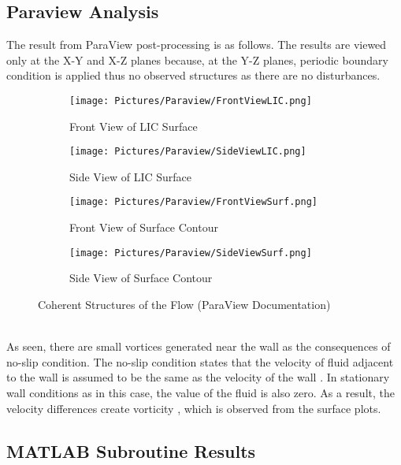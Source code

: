 \documentclass[11pt]{article}
\begin{document}
\subsection{Paraview Analysis}
The result from ParaView post-processing is as follows. The results are viewed only at the X-Y and X-Z planes because, at the Y-Z planes, periodic boundary condition is applied thus no observed structures as there are no disturbances. 
\begin{figure}[h!]
     \centering
     \begin{subfigure}[ht]{0.49\textwidth}
         \centering
         \texttt{[image: Pictures/Paraview/FrontViewLIC.png]}
         \caption{Front View of LIC Surface}
         \label{fig:FVLIC}
     \end{subfigure}
     \begin{subfigure}[ht]{0.49\textwidth}
         \centering
         \texttt{[image: Pictures/Paraview/SideViewLIC.png]}
         \caption{Side View of LIC Surface}
         \label{fig:SVLIC}
     \end{subfigure}
     \begin{subfigure}[ht]{0.49\textwidth}
         \centering
        \texttt{[image: Pictures/Paraview/FrontViewSurf.png]}
         \caption{Front View of Surface Contour}
         \label{fig:FVSC}
     \end{subfigure}
     \begin{subfigure}[ht]{0.49\textwidth}
         \centering
        \texttt{[image: Pictures/Paraview/SideViewSurf.png]}
         \caption{Side View of Surface Contour}
         \label{fig:SVSC}
     \end{subfigure}
        \caption{Coherent Structures of the Flow (ParaView Documentation)}
        \label{fig:Cohstruct}
\end{figure}
\\
\noindent As seen, there are small vortices generated near the wall as the consequences of no-slip condition. The no-slip condition states that the velocity of fluid adjacent to the wall is assumed to be the same as the velocity of the wall \citep{Day1990}. In stationary wall conditions as in this case, the value of the fluid is also zero. As a result, the velocity differences create vorticity \citep{Heijst2012}, which is observed from the surface plots.

\subsection{MATLAB Subroutine Results}
\end{document}
